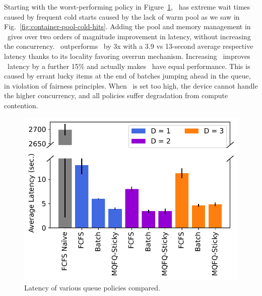 Starting with the worst-performing policy in Figure~\ref{fig:queue-e2e}, \naive~has extreme wait times caused by frequent cold starts caused by the lack of warm pool as we saw in Fig.~\ref{fig:container-pool-cold-hits}.
Adding the pool and memory management in \fcfs~gives over two orders of magnitude improvement in latency, without increasing the concurrency.
\QName~outperforms \fcfs~by 3x with a 3.9 vs 13-second average respective latency thanks to its locality favoring overrun mechanism.
Increasing \D~improves \QName~latency by a further 15\% and actually makes \batch~have equal performance.
This is caused by errant lucky items at the end of batches jumping ahead in the queue, in violation of fairness principles.
When \D~is set too high, the device cannot handle the higher concurrency, and all policies suffer degradation from compute contention.

\begin{figure}
  \centering
  \includegraphics{mqfq/graphs/q_compare/25.7/20/paper_e2e_sec.pdf}
  \caption{Latency of various queue policies compared.}
  \label{fig:queue-e2e}
\end{figure}



